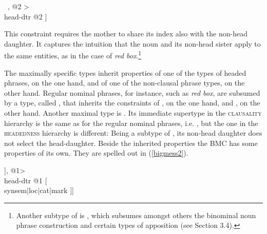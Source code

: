 \documentclass[output=paper
                ,modfonts
                ,nonflat
	        ,collection
	        ,collectionchapter
	        ,collectiontoclongg
 	        ,biblatex
                ,babelshorthands
                ,newtxmath
                ,draftmode
                ,colorlinks, citecolor=brown
]{./langsci/langscibook}
\begin{document}
\begin{exe}
\ex\label{mononom} 
\begin{avm}
[\type{intersective-modification}                \\
 synsem|loc|content|index @1 \type{index}      \\
 dtrs <[synsem|loc|content|index @1 ] ~, @2 > \\
 head-dtr @2  ]
\end{avm}
\end{exe}

\noindent 
This constraint requires the mother to share its index also with the 
non-head daughter. It captures the intuition that the 
noun and its non-head sister apply to the same entities, as in 
the case of \emph{red box}.\footnote{Another subtype of  
is , which subsumes amongst others 
the binominal noun phrase construction and certain types of apposition
(see Section 3.4).}  

The maximally specific types inherit properties of one of the types of headed phrases,
on the one hand, and of one of the non-clausal phrase types, on the other hand.  
Regular nominal phrases, for instance, such as \emph{red box}, are subsumed 
by a type, called , that inherits the 
constraints of , on the one hand, and 
, on the other hand.  
Another maximal type is . 
Its immediate supertype in the \textsc{clausality} hierarchy is the same 
as for the regular nominal phrases, i.e. , 
but the one in the \textsc{headedness} hierarchy is different: 
Being a subtype of , 
its non-head daughter does not select the head-daughter. 
Beside the inherited properties the BMC has some properties of its own.   
They are spelled out in (\ref{bigmess2}).

\begin{exe}
\ex\label{bigmess2} 
\begin{avm}
[\type{big-mess-phr}                                    \\     
 dtrs <[\type{hd-functor-phr}                         \\
          synsem|loc|cat [head \type{adjective}       \\
                          mark \type{marked} ]], @1> \\
 head-dtr @1 [              \\
                synsem|loc|cat|mark ]]
\end{avm}
\end{exe}
\end{document}
